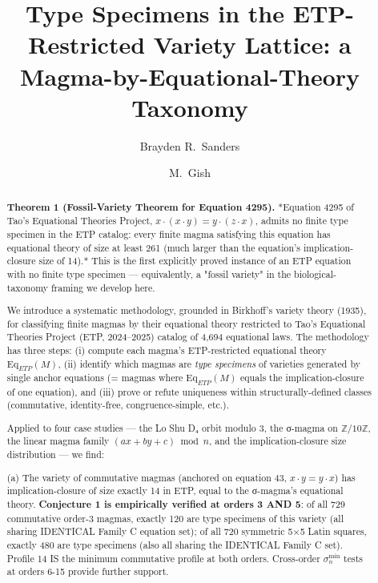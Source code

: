 \documentclass[11pt,reqno]{amsart}
\title[Type Specimens in the ETP-Restricted Var]{Type Specimens in the ETP-Restricted Variety Lattice: a Magma-by-Equational-Theory Taxonomy}
\author{Brayden R.\ Sanders}
\author{M.\ Gish}
\theoremstyle{plain}
\theoremstyle{definition}
\begin{document}
\maketitle


\begin{abstract}

\textbf{Theorem 1 (Fossil-Variety Theorem for Equation 4295).} *Equation 4295 of Tao's Equational Theories Project, $x \cdot (x \cdot y) = y \cdot (z \cdot x)$, admits no finite type specimen in the ETP catalog: every finite magma satisfying this equation has equational theory of size at least 261 (much larger than the equation's implication-closure size of 14).* This is the first explicitly proved instance of an ETP equation with no finite type specimen --- equivalently, a "fossil variety" in the biological-taxonomy framing we develop here.

We introduce a systematic methodology, grounded in Birkhoff's variety theory (1935), for classifying finite magmas by their equational theory restricted to Tao's Equational Theories Project (ETP, 2024–2025) catalog of 4,694 equational laws. The methodology has three steps: (i) compute each magma's ETP-restricted equational theory $\mathrm{Eq}_{ETP}(M)$, (ii) identify which magmas are \textit{type specimens} of varieties generated by single anchor equations (= magmas where $\mathrm{Eq}_{ETP}(M)$ equals the implication-closure of one equation), and (iii) prove or refute uniqueness within structurally-defined classes (commutative, identity-free, congruence-simple, etc.).

Applied to four case studies --- the Lo Shu D₄ orbit modulo 3, the σ-magma on $\mathbb{Z}/10\mathbb{Z}$, the linear magma family $(ax+by+c) \bmod n$, and the implication-closure size distribution --- we find:

(a) The variety of commutative magmas (anchored on equation 43, $x \cdot y = y \cdot x$) has implication-closure of size exactly 14 in ETP, equal to the σ-magma's equational theory. \textbf{Conjecture 1 is empirically verified at orders 3 AND 5}: of all 729 commutative order-3 magmas, exactly 120 are type specimens of this variety (all sharing IDENTICAL Family C equation set); of all 720 symmetric 5×5 Latin squares, exactly 480 are type specimens (also all sharing the IDENTICAL Family C set). Profile 14 IS the minimum commutative profile at both orders. Cross-order $\sigma_n^{\min}$ tests at orders 6-15 provide further support.


\end{abstract}
\end{document}
